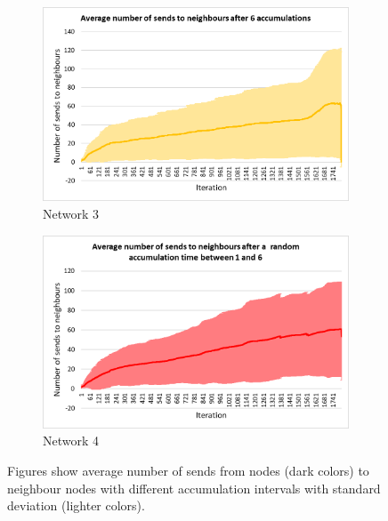 \documentclass[USenglish]{uit-thesis}
\begin{document}
\begin{figure}
\begin{subfigure}[b]{0.475\textwidth}
            \includegraphics[width=\textwidth]{numSends_stdev_6.png}
            \caption[]%
            {{\small Network 3}}    
            \label{fig:sendfig3}
        \end{subfigure}
        \quad
        \begin{subfigure}[b]{0.475\textwidth}   
            \centering 
            \includegraphics[width=\textwidth]{numSends_stdev_rand.png}
            \caption[]%
            {{\small Network 4}}    
            \label{fig:sendfig4}
        \end{subfigure}
        \caption[Figures show average number of sends from nodes to neighbour nodes with different accumulation intervals with standard deviation.]
        {\small Figures show average number of sends from nodes (dark colors) to neighbour nodes with different accumulation intervals with standard deviation (lighter colors).} 
        \label{fig:sendsChart}
    \end{figure}
\end{document}
